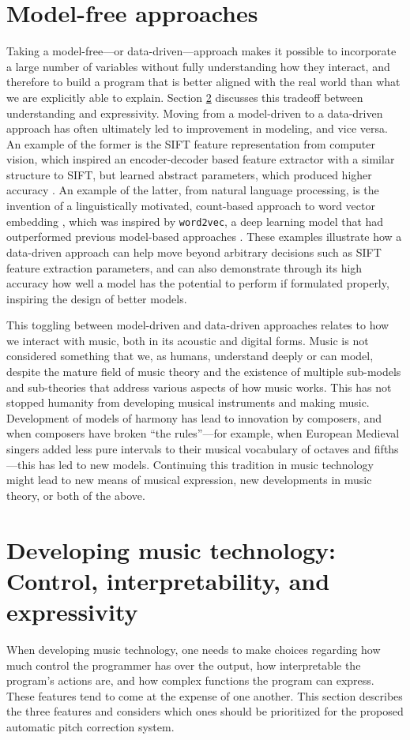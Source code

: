 \section{Model-free approaches}
\label{sec:pretheory}
Taking a model-free---or data-driven---approach makes it possible to incorporate a large number of variables without fully understanding how they interact, and therefore to build a program that is better aligned with the real world than what we are explicitly able to explain. Section \ref{sec:control-interpret-express} discusses this tradeoff between understanding and expressivity. Moving from a model-driven to a data-driven approach has often ultimately led to improvement in modeling, and vice versa. An example of the former is the SIFT feature representation from computer vision, which inspired an encoder-decoder based feature extractor with a similar structure to SIFT, but learned abstract parameters, which produced higher accuracy \cite{zheng2017sift}. An example of the latter, from natural language processing, is the invention of a linguistically motivated, count-based approach to word vector embedding \cite{pennington2014glove}, which was inspired by \texttt{word2vec}, a deep learning model that had outperformed previous model-based approaches \cite{mikolov2013efficient}. These examples illustrate how a data-driven approach can help move beyond arbitrary decisions such as SIFT feature extraction parameters, and can also demonstrate through its high accuracy how well a model has the potential to perform if formulated properly, inspiring the design of better models.

This toggling between model-driven and data-driven approaches relates to how we interact with music, both in its acoustic and digital forms. Music is not considered something that we, as humans, understand deeply or can model, despite the mature field of music theory and the existence of multiple sub-models and sub-theories that address various aspects of how music works. This has not stopped humanity from developing musical instruments and making music. Development of models of harmony has lead to innovation by composers, and when composers have broken ``the rules''---for example, when European Medieval singers added less pure intervals to their musical vocabulary of octaves and fifths---this has led to new models. Continuing this tradition in music technology might lead to new means of musical expression, new developments in music theory, or both of the above.

\section{Developing music technology: Control, interpretability, and expressivity}
\label{sec:control-interpret-express}
When developing music technology, one needs to make choices regarding how much control the programmer has over the output, how interpretable the program's actions are, and how complex functions the program can express. These features tend to come at the expense of one another. This section describes the three features and considers which ones should be prioritized for the proposed automatic pitch correction system. 


